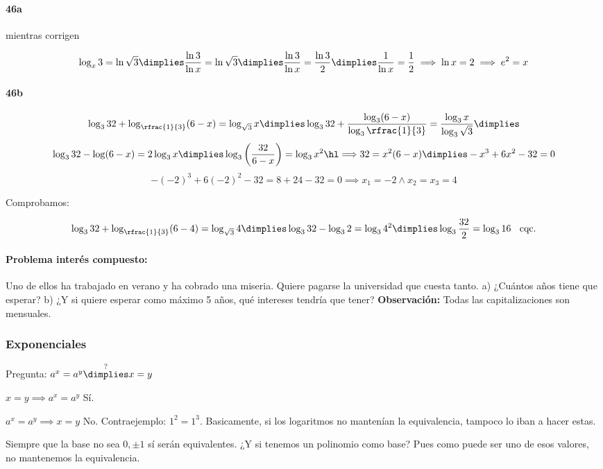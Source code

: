 \paragraph{46a} mientras corrigen

\[
	\log_x 3 = \ln \sqrt{3} \dimplies \frac{\ln3}{\ln x}=\ln\sqrt{3} \dimplies \frac{\ln3}{\ln x}=\frac{\ln3}{2} \dimplies \frac{1}{\ln x}=\frac{1}{2} \implies \ln x = 2 \implies e^2=x
\]

\paragraph{46b}
\[
	\log_332+\log_{\rfrac{1}{3}}(6-x) = \log_{\sqrt{3}}x \dimplies \log_332+\frac{\log_3(6-x)}{\log_3\rfrac{1}{3}} = \frac{\log_3x}{\log_3{\sqrt{3}}} \dimplies 
\]
\[
	\log_332-\log(6-x)=2\log_3x\dimplies \log_3\left(\frac{32}{6-x}\right)=\log_3x^2 \cimplies 32=x^2(6-x) \dimplies -x^3+6x^2-32 = 0
\]
\[
	-(-2)^3 + 6(-2)^2-32 = 8+24-32 = 0\implies x_1=-2 \wedge x_2=x_3=4
\]
 
Comprobamos:

\[
	\log_332+\log_{\rfrac{1}{3}}(6-4) = \log_{\sqrt{3}}4 \dimplies \log_332-\log_32=\log_34^2 \dimplies \log_3\frac{32}{2}=\log_316 \;\;\text{   cqc.}
\]


\paragraph{Problema interés compuesto:} Uno de ellos ha trabajado en verano y ha cobrado una miseria. Quiere pagarse la universidad que cuesta tanto.
a) ¿Cuántos años tiene que esperar?
b) ¿Y si quiere esperar como máximo 5 años, qué intereses tendría que tener?
\textbf{Observación:} Todas las capitalizaciones son mensuales.


\subsubsection{Exponenciales}

Pregunta: $a^x=a^y \overset{?}{\dimplies} x=y$

$x=y\implies a^x=a^y$ Sí.

$a^x=a^y\implies x=y$ No. Contraejemplo: $1^2=1^3$.  Basicamente, si los logaritmos no mantenían la equivalencia, tampoco lo iban a hacer estas.

Siempre que la base no sea $0,±1$ sí serán equivalentes. ¿Y si tenemos un polinomio como base? Pues como puede ser uno de esos valores, no mantenemos la equivalencia.


